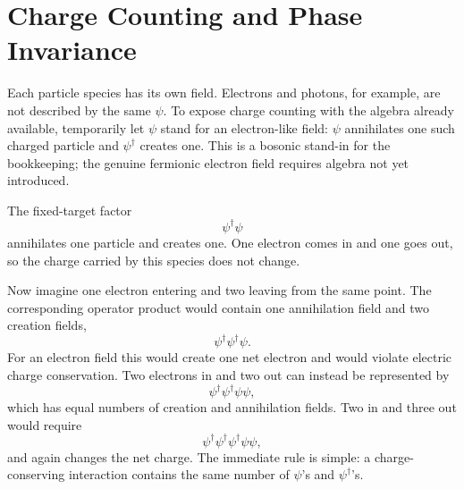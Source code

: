 \section{Charge Counting and Phase Invariance}

Each particle species has its own field. Electrons and photons, for example, are not described by the same \(\psi\). To expose charge counting with the algebra already available, temporarily let \(\psi\) stand for an electron-like field: \(\psi\) annihilates one such charged particle and \(\psi^\dagger\) creates one. This is a bosonic stand-in for the bookkeeping; the genuine fermionic electron field requires algebra not yet introduced.

The fixed-target factor
\begin{equation}
\psi^\dagger\psi
\end{equation}
annihilates one particle and creates one. One electron comes in and one goes out, so the charge carried by this species does not change.

Now imagine one electron entering and two leaving from the same point. The corresponding operator product would contain one annihilation field and two creation fields,
\begin{equation}
\psi^\dagger\psi^\dagger\psi.
\end{equation}
For an electron field this would create one net electron and would violate electric charge conservation. Two electrons in and two out can instead be represented by
\begin{equation}
\psi^\dagger\psi^\dagger\psi\psi,
\end{equation}
which has equal numbers of creation and annihilation fields. Two in and three out would require
\begin{equation}
\psi^\dagger\psi^\dagger\psi^\dagger\psi\psi,
\end{equation}
and again changes the net charge. The immediate rule is simple: a charge-conserving interaction contains the same number of \(\psi\)'s and \(\psi^\dagger\)'s.

\begin{classroomqa}
\end{classroomqa}


